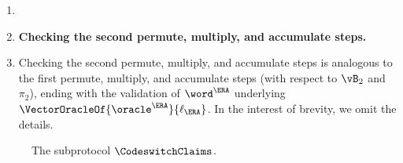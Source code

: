 \begin{tcolorbox}[breakable, enhanced, colback=white, boxrule=0.65pt]
\begin{enumerate}[nolistsep]
        \item [] \item[] \textbf{Checking the second permute, multiply, and accumulate steps.}
        \item Checking the second permute, multiply, and accumulate steps is analogous to the first permute, multiply, and accumulate steps (with respect to $\vB_2$ and $\pi_2$), ending with the validation of $\word^{\ERA}$ underlying $\VectorOracleOf{\oracle^{\ERA}}{\ell_{\ERA}}$. In the interest of brevity, we omit the details.
    \end{enumerate}
\end{tcolorbox}
\begin{figure}[htbp]
\caption{The subprotocol $\CodeswitchClaims$.}
\label{fig:codeswitch-claims}
\end{figure}